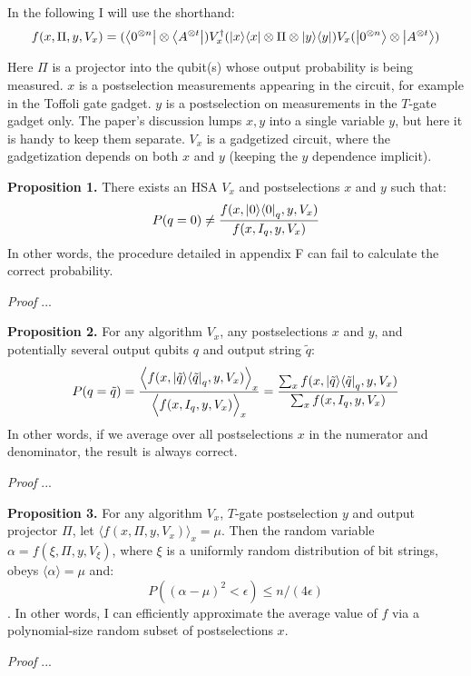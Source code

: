 \documentclass[11pt]{article}
\begin{document}
In the following I will use the shorthand:
$$f(x, \Pi, y, V_x) = ({\left\langle{0^{\otimes n}}\right\vert} \otimes {\left\langle{A^{\otimes t}}\right\vert}) V^\dagger_x ( {\left\vert{x}\right\rangle}{\left\langle{x}\right\vert} \otimes \Pi \otimes {\left\vert{y}\right\rangle}{\left\langle{y}\right\vert}) V_x ({\left\vert{0^{\otimes n}}\right\rangle} \otimes {\left\vert{A^{\otimes t}}\right\rangle}) $$

Here $\Pi$ is a projector into the qubit(s) whose output probability is being measured. $x$ is a postselection measurements appearing in the circuit, for example in the Toffoli gate gadget. $y$ is a postselection on measurements in the $T$-gate gadget only. The paper's discussion lumps $x,y$ into a single variable $y$, but here it is handy to keep them separate. $V_x$ is a gadgetized circuit, where the gadgetization depends on both $x$ and $y$ (keeping the $y$ dependence implicit).

\textbf{Proposition 1.} There exists an HSA $V_x$ and postselections $x$ and $y$ such that:
$$P(q=0) \neq \frac{f(x, {\left\vert{0}\right\rangle}{\left\langle{0}\right\vert}_q, y, V_x)}{f(x, I_q, y, V_x)}$$
In other words, the procedure detailed in appendix F can fail to calculate the correct probability.

\textit{Proof} ...


\textbf{Proposition 2.} For any algorithm $V_x$, any postselections $x$ and $y$, and potentially several output qubits $q$ and output string $\tilde q$:
$$P(q=\tilde q) = \frac{\left\langle  f(x, {\left\vert{\tilde q}\right\rangle}{\left\langle{\tilde q}\right\vert}_q, y, V_x) \right\rangle_x}{\Big\langle  f(x, I_q, y, V_x) \Big\rangle_x} = \frac{ \sum_x  f(x, {\left\vert{\tilde q}\right\rangle}{\left\langle{\tilde q}\right\vert}_q, y, V_x) }{\sum_{x}  f(x, I_q, y, V_x) }$$
In other words, if we average over all postselections $x$ in the numerator and denominator, the result is always correct.

\textit{Proof} ...

\textbf{Proposition 3.} For any algorithm $V_x$, $T$-gate postselection $y$ and output projector $\Pi$, let $\Big\langle  f(x, \Pi, y, V_x) \Big\rangle_x = \mu$. Then the random variable $\alpha = f(\xi, \Pi, y, V_\xi)$, where $\xi$ is a uniformly random distribution of bit strings, obeys $\langle\alpha\rangle = \mu$ and:
$$P( (\alpha - \mu)^2 < \epsilon ) \leq n/(4\epsilon) $$.
In other words, I can efficiently approximate the average value of $f$ via a polynomial-size random subset of postselections $x$.

\textit{Proof} ...
\end{document}
